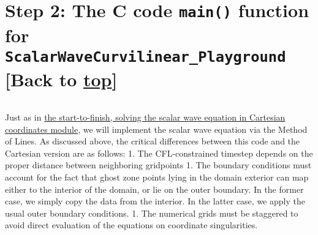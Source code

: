 \documentclass[landscape,letterpaper,10pt,english]{article}
\begin{document}
    \hypertarget{step-2-the-c-code-main-function-for-scalarwavecurvilinear_playground-back-to-top}{%
\section{\texorpdfstring{Step 2: The C code \texttt{main()} function for
\texttt{ScalarWaveCurvilinear\_Playground} {[}Back to
\hyperref[toc]{top}{]}}{Step 2: The C code main() function for ScalarWaveCurvilinear\_Playground {[}Back to {]}}}\label{step-2-the-c-code-main-function-for-scalarwavecurvilinear_playground-back-to-top}}

\[\label{mainc}\]

Just as in \href{Tutorial-Start_to_Finish-ScalarWave.ipynb}{the
start-to-finish, solving the scalar wave equation in Cartesian
coordinates module}, we will implement the scalar wave equation via the
Method of Lines. As discussed above, the critical differences between
this code and the Cartesian version are as follows: 1. The
CFL-constrained timestep depends on the proper distance between
neighboring gridpoints 1. The boundary conditions must account for the
fact that ghost zone points lying in the domain exterior can map either
to the interior of the domain, or lie on the outer boundary. In the
former case, we simply copy the data from the interior. In the latter
case, we apply the usual outer boundary conditions. 1. The numerical
grids must be staggered to avoid direct evaluation of the equations on
coordinate singularities.
\end{document}
